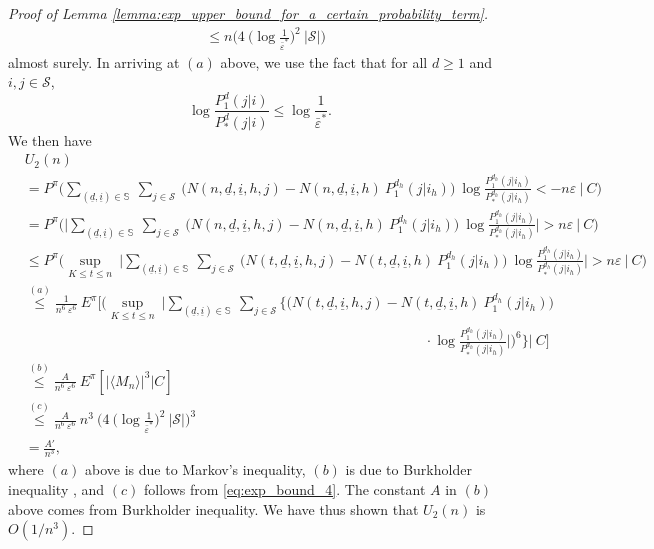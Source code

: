 \begin{proof}[Proof of Lemma \ref{lemma:exp_upper_bound_for_a_certain_probability_term}]
\begin{align}
	&\leq n\bigg(4~\bigg(\log \frac{1}{\bar{\varepsilon}^*}\bigg)^2~|\mathcal{S}|\bigg)
	\label{eq:exp_bound_4}
\end{align}
almost surely.
In arriving at $(a)$ above, we use the fact that for all $d\geq 1$ and $i, j\in \mathcal{S}$, $$ \log \frac{P_1^{d}(j|i)}{P_*^{d}(j|i)}\leq \log \frac{1}{\bar{\varepsilon}^*}. $$
We then have
\begin{align}
	&U_2(n)\nonumber\\
	&=P^\pi\bigg(\sum\limits_{(\underline{d}, \underline{i})\in \mathbb{S}}~\sum\limits_{j\in \mathcal{S}}~\bigg(N(n, \underline{d}, \underline{i}, h, j)-N(n, \underline{d}, \underline{i}, h)~P_1^{d_h}(j|i_h)\bigg)~\log \frac{P_1^{d_h}(j|i_h)}{P_*^{d_h}(j|i_h)} < -n\varepsilon ~\bigg|~C\bigg)\nonumber\\
	&=P^\pi\bigg(\bigg\lvert\sum\limits_{(\underline{d}, \underline{i})\in \mathbb{S}}~\sum\limits_{j\in \mathcal{S}}~\bigg(N(n, \underline{d}, \underline{i}, h, j)-N(n, \underline{d}, \underline{i}, h)~P_1^{d_h}(j|i_h)\bigg)~\log \frac{P_1^{d_h}(j|i_h)}{P_*^{d_h}(j|i_h)}\bigg\rvert > n\varepsilon ~\bigg|~C\bigg)\nonumber\\
	&\leq P^\pi\bigg(\sup\limits_{K\leq t\leq n}~\bigg\lvert\sum\limits_{(\underline{d}, \underline{i})\in \mathbb{S}}~\sum\limits_{j\in \mathcal{S}}~\bigg(N(t, \underline{d}, \underline{i}, h, j)-N(t, \underline{d}, \underline{i}, h)~P_1^{d_h}(j|i_h)\bigg)~\log \frac{P_1^{d_h}(j|i_h)}{P_*^{d_h}(j|i_h)}\bigg\rvert > n\varepsilon ~\bigg|~C\bigg)\nonumber\\
	&\stackrel{(a)}{\leq} \frac{1}{n^6~\varepsilon^6}~E^\pi\bigg[\bigg(\sup\limits_{K\leq t\leq n}~\bigg\lvert\sum\limits_{(\underline{d}, \underline{i})\in \mathbb{S}}~\sum\limits_{j\in \mathcal{S}}\bigg\lbrace\bigg(N(t, \underline{d}, \underline{i}, h, j)-N(t, \underline{d}, \underline{i}, h)~P_1^{d_h}(j|i_h)\bigg)\nonumber\\
	&\hspace{12cm}\cdot\log \frac{P_1^{d_h}(j|i_h)}{P_*^{d_h}(j|i_h)}\bigg\rvert\bigg)^6 \bigg\rbrace\bigg|~C\bigg]\nonumber\\
	&\stackrel{(b)}{\leq} \frac{A}{n^6~\varepsilon^6}~E^\pi[|\langle M_n \rangle|^{3}|C]\nonumber\\
	&\stackrel{(c)}{\leq }\frac{A}{n^6~\varepsilon^6}~n^{3}~\bigg(4~\bigg(\log \frac{1}{\bar{\varepsilon}^*}\bigg)^2~|\mathcal{S}|\bigg)^{3}\nonumber\\
	&= \frac{A'}{n^{3}},
	\label{eq:exp_bound_5}
\end{align}
where $(a)$ above is due to Markov's inequality, $(b)$ is due to Burkholder inequality \cite[p. 414]{chow2012probability}, and $(c)$ follows from \eqref{eq:exp_bound_4}. The constant $A$ in $(b)$ above comes from Burkholder inequality. We have thus shown that $U_2(n)$ is $O(1/n^3)$.


\end{proof}
